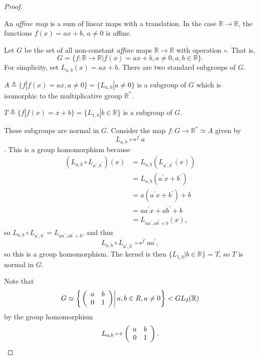 \begin{proof}

\begin{defn}
An \emph{affine map} is a sum of linear maps with a translation. In
the case $\mathbb{R} \to \mathbb{R}$, the functions $f(x) = ax + b$,
$a \neq 0$ is affine.
\end{defn}

\begin{xmpl}
Let $G$ be the set of all non-constant \emph{affine} maps
$\mathbb{R} \to \mathbb{R}$ with operation $\circ$. That is,
$$
G = \{ f : \mathbb{R} \to \mathbb{R} | f(x) = ax + b,
                                       a \neq 0,
                                       a, b \in \mathbb{R}
    \}.
$$
For simplicity, set $L_{a,b}(x) = ax + b$. There are two standard
subgroups of $G$.

$A \triangleq \{ f | f(x) = ax, a \neq 0 \} = \{L_{a, 0} | a \neq 0\}$
is a subgroup of $G$ which is isomorphic to the multiplicative group
$\mathbb{R}^\ast$.

$T \triangleq \{ f | f(x) = x + b \} = \{ L_{1,b} | b \in \mathbb{R}
\}$ is a subgroup of $G$.

These subgroups are normal in $G$. Consider the map
$f : G \to \mathbb{R}^\ast \simeq A$ given by
$$
L_{a,b} \mathrel{\mathop{\mapsto}^{f}} a
$$.
This is a group homomorphism because
\begin{align*}
(L_{a,b} \circ L_{a^\prime, b^\prime})(x)
 & = L_{a,b}(L_{a^\prime, b^\prime}(x)) \\
 & = L_{a,b}(a^\prime x + b^\prime) \\
 & = a(a^\prime x + b^\prime) + b \\
 & = aa^\prime x + ab^\prime + b \\
 & = L_{a a^\prime, a b^\prime + b}(x),
\end{align*}
so $L_{a,b} \circ L_{a^\prime, b^\prime} = L_{a a^\prime, a b^\prime +
  b}$, and thus
$$
L_{a,b} \circ L_{a^\prime, b^\prime} \mathrel{\mathop{\mapsto}^{f}} a a^\prime,
$$
so this is a group homomorphism. The kernel is then
$\{L_{1,b} | b \in \mathbb{R} \} = T$, so $T$ is normal in $G$.
\end{xmpl}

Note that
$$
G \simeq \left\{
\left.\left(\begin{array}{c c}
a & b \\ 0 & 1
\end{array}\right)\right| a, b \in R, a \neq 0
\right\} < GL_2(\mathbb{R})
$$
by the group homomorphism
$$
L_{a,b} \mapsto \left(\begin{array}{c c}
a & b \\ 0 & 1
\end{array}\right).
$$


\end{proof}
